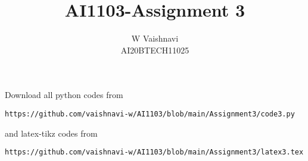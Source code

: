 \documentclass[journal,12pt,twocolumn]{IEEEtran}
\DeclareMathOperator*{\Res}{Res}
\begin{document}
\newcommand{\BEQA}{\begin{eqnarray}}
\newcommand{\EEQA}{\end{eqnarray}}
\newcommand{\define}{\stackrel{\triangle}{=}}

\raggedbottom
\setlength{\parindent}{0pt}
\providecommand{\mbf}{\mathbf}
\providecommand{\pr}[1]{\ensuremath{\Pr\left(#1\right)}}
\providecommand{\qfunc}[1]{\ensuremath{Q\left(#1\right)}}
\providecommand{\sbrak}[1]{\ensuremath{{}\left[#1\right]}}
\providecommand{\lsbrak}[1]{\ensuremath{{}\left[#1\right.}}
\providecommand{\rsbrak}[1]{\ensuremath{{}\left.#1\right]}}
\providecommand{\brak}[1]{\ensuremath{\left(#1\right)}}
\providecommand{\lbrak}[1]{\ensuremath{\left(#1\right.}}
\providecommand{\rbrak}[1]{\ensuremath{\left.#1\right)}}
\providecommand{\cbrak}[1]{\ensuremath{\left\{#1\right\}}}
\providecommand{\lcbrak}[1]{\ensuremath{\left\{#1\right.}}
\providecommand{\rcbrak}[1]{\ensuremath{\left.#1\right\}}}
\theoremstyle{remark}
\newtheorem{rem}{Remark}
\newcommand{\sgn}{\mathop{\mathrm{sgn}}}
\providecommand{\abs}[1]{\vert#1\vert}
\providecommand{\res}[1]{\Res\displaylimits_{#1}} 
\providecommand{\norm}[1]{\lVert#1\rVert}
\providecommand{\mtx}[1]{\mathbf{#1}}
\providecommand{\mean}[1]{E[ #1 ]}
\providecommand{\fourier}{\overset{\mathcal{F}}{ \rightleftharpoons}}
\providecommand{\system}{\overset{\mathcal{H}}{ \longleftrightarrow}}
\newcommand{\solution}{\noindent \textbf{Solution: }}
\newcommand{\cosec}{\,\text{cosec}\,}
\providecommand{\dec}[2]{\ensuremath{\overset{#1}{\underset{#2}{\gtrless}}}}
\newcommand{\myvec}[1]{\ensuremath{\begin{pmatrix}#1\end{pmatrix}}}
\newcommand{\mydet}[1]{\ensuremath{\begin{vmatrix}#1\end{vmatrix}}}
\makeatletter
{}
\makeatother
\let\StandardTheFigure\thefigure
\let\vec\mathbf
\renewcommand{\thefigure}{\theproblem}
\def\putbox#1#2#3{\makebox[0in][l]{\makebox[#1][l]{}\raisebox{\baselineskip}[0in][0in]{\raisebox{#2}[0in][0in]{#3}}}}
     \def\rightbox#1{\makebox[0in][r]{#1}}
     \def\centbox#1{\makebox[0in]{#1}}
     \def\topbox#1{\raisebox{-\baselineskip}[0in][0in]{#1}}
     \def\midbox#1{\raisebox{-0.5\baselineskip}[0in][0in]{#1}}
\vspace{3cm}
\title{AI1103-Assignment 3}
\author{W Vaishnavi\\AI20BTECH11025}
\maketitle
\newpage
\bigskip
\renewcommand{\thefigure}{\theenumi}
\renewcommand{\thetable}{\theenumi}
Download all python codes from 
%
\begin{lstlisting}
https://github.com/vaishnavi-w/AI1103/blob/main/Assignment3/code3.py
\end{lstlisting}
and latex-tikz codes from 
%
\begin{lstlisting}
https://github.com/vaishnavi-w/AI1103/blob/main/Assignment3/latex3.tex
\end{lstlisting}
\end{document}
